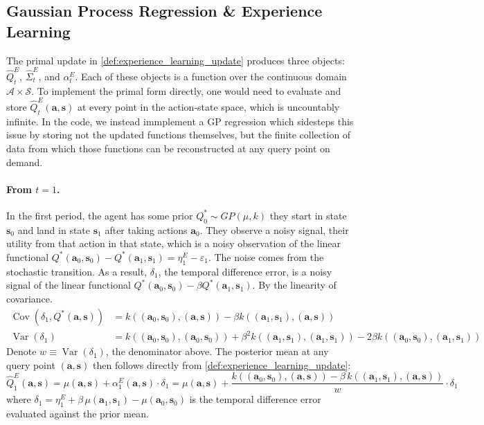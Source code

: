 \subsection{Gaussian Process Regression \& Experience Learning} \label{app:gp_regression_equivalence}

The primal update in \ref{def:experience_learning_update} produces
three objects: $\hat{Q}^E_t$, $\hat{\Sigma}^E_t$, and $\alpha^E_t$. Each
of these objects is a function over the continuous domain $\mathcal{A} \times \mathcal{S}$.
To implement the primal form directly, one would need to evaluate and store
$\hat{Q}^E_t(\mathbf{a}, \mathbf{s})$ at every point in the action-state space,
which is uncountably infinite. In the code, we instead immplement a GP regression which
sidesteps this issue by storing not the updated functions themselves, but the finite collection
of data from which those functions can be reconstructed at any query point on demand.

\paragraph{From $t = 1$.} In the first period, the agent has some prior $Q^*_0 \sim GP(\mu, k)$
they start in state $\mathbf{s}_0$ and land in state $\mathbf{s}_1$ after taking actions $\mathbf{a}_0$.
They observe a noisy signal, their utility from that action in that state, which is 
a noisy observation of the linear functional $Q^*(\mathbf{a}_0, \mathbf{s}_0) - Q^*(\mathbf{a}_1, \mathbf{s}_1) = \eta^E_1 - \varepsilon_1$.
The noise comes from the stochastic transition. As a result, $\delta_1$, the temporal difference
error, is a noisy signal of the linear functional $Q^*(\mathbf{a}_0, \mathbf{s}_0) - \beta Q^*(\mathbf{a}_1, \mathbf{s}_1)$.
By the linearity of covariance.
\begin{align}
    \operatorname{Cov}(\delta_1, Q^*(\mathbf{a}, \mathbf{s})) &= k((\mathbf{a}_0, \mathbf{s}_0), (\mathbf{a}, \mathbf{s})) - \beta k((\mathbf{a}_1, \mathbf{s}_1), (\mathbf{a}, \mathbf{s})) \\
    \operatorname{Var}(\delta_1) &= k((\mathbf{a}_0, \mathbf{s}_0), (\mathbf{a}_0, \mathbf{s}_0)) + \beta^2 k((\mathbf{a}_1, \mathbf{s}_1), (\mathbf{a}_1, \mathbf{s}_1)) - 2\beta k((\mathbf{a}_0, \mathbf{s}_0), (\mathbf{a}_1, \mathbf{s}_1))
\end{align}
Denote $w \equiv \operatorname{Var}(\delta_1)$, the denominator above.
The posterior mean at any query point $(\mathbf{a}, \mathbf{s})$ then follows directly 
from \ref{def:experience_learning_update}:
\begin{equation}
    \hat{Q}^E_1(\mathbf{a}, \mathbf{s}) 
    = \mu(\mathbf{a}, \mathbf{s}) 
    + \alpha^E_1(\mathbf{a}, \mathbf{s}) \cdot \delta_1
    = \mu(\mathbf{a}, \mathbf{s}) 
    + \frac{k((\mathbf{a}_0, \mathbf{s}_0), (\mathbf{a}, \mathbf{s})) 
    - \beta\, k((\mathbf{a}_1, \mathbf{s}_1), (\mathbf{a}, \mathbf{s}))}{w} 
    \cdot \delta_1
\end{equation}
where $\delta_1 = \eta^E_1 + \beta\, \mu(\mathbf{a}_1, \mathbf{s}_1) - \mu(\mathbf{a}_0, \mathbf{s}_0)$
is the temporal difference error evaluated against the prior mean.


